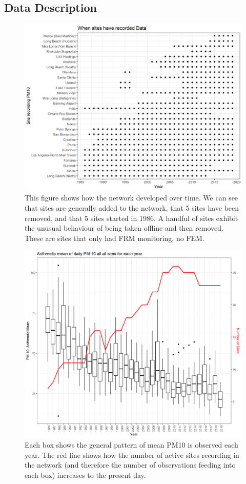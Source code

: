 \documentclass{article}
\begin{document}
\subsection{Data Description}
\label{subsec:datadescripion}
\begin{figure}[ht]
	\centering
	\includegraphics[width = \textwidth]{Figures/site_dotplot-colour.png}
	\caption{This figure shows how the network developed over time.  We can see that sites are generally added to the network, that 5 sites have been removed, and that 5 sites started in 1986.  A handful of sites exhibit the unusual behaviour of being taken offline and then removed.  These are sites that only had \ac{FRM} monitoring, no \ac{FEM}.}
	\label{fig:site_dotplot}
\end{figure}

\begin{figure}[ht]
	\centering
	\includegraphics[width = \textwidth]{Figures/site_trend-ArthmM_NumSites.png}
	\caption{Each box shows the general pattern of mean 
		PM10 is observed each year.  The red line shows how the number of active sites recording in the network (and therefore the number of observations feeding into each box) increases to the present day.}
	\label{fig:site_trend-ArthmM_NumSites}
\end{figure} 
\end{document}
